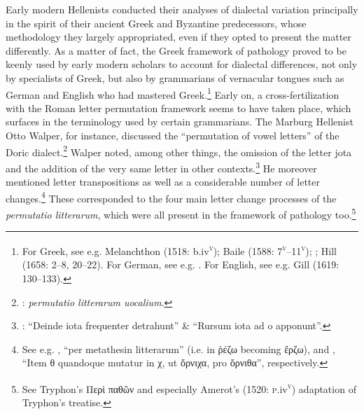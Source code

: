 Early modern Hellenists conducted their analyses of dialectal variation principally in the spirit of their ancient Greek and Byzantine predecessors, whose methodology they largely appropriated, even if they opted to present the matter differently. As a matter of fact, the Greek framework of pathology proved to be keenly used by early modern scholars to account for dialectal differences, not only by specialists of Greek, but also by grammarians of vernacular tongues such as German and English who had mastered Greek.\footnote{{For Greek, see e.g. Melanchthon (1518: b.iv}{\textsc{\textsuperscript{v}}}{); Baile (1588: 7}{\textsc{\textsuperscript{v}}}{–11}{\textsc{\textsuperscript{v}}}{); \citet[11]{Schmidt1604}; Hill (1658: 2–8, 20–22). For German, see e.g. \citet{Wolf1578}. For English, see e.g. Gill (1619: 130–133).}} Early on, a cross-fertilization with the Roman letter permutation framework seems to have taken place, which surfaces in the terminology used by certain grammarians. The Marburg Hellenist Otto Walper, for instance, discussed the “permutation of vowel letters” of the Doric dialect.\footnote{{\citet[62]{Walper1589}:} {\textit{permutatio litterarum uocalium}}.} Walper noted, among other things, the omission of the letter jota and the addition of the very same letter in other contexts.\footnote{{\citet[63]{Walper1589}: “Deinde iota frequenter detrahunt” \& “Rursum iota ad o apponunt”.}} He moreover mentioned letter transpositions as well as a considerable number of letter changes.\footnote{{See e.g. \citet[63]{Walper1589}, “per metathesin litterarum” (i.e. in ῥέζω becoming ἔρζω), and \citet[64]{Walper1589}, “Item θ quandoque mutatur in χ, ut ὄρνιχα, pro ὄρνιθα”, respectively.}} These corresponded to the four main letter change processes of the \textit{permutatio litterarum}, which were all present in the framework of pathology too.\footnote{{See Tryphon’s Περὶ παθῶν and especially Amerot’s (1520:} {\textsc{p.}}{iv}{\textsc{\textsuperscript{v}}}{)} {adaptation of Tryphon’s treatise.}}

